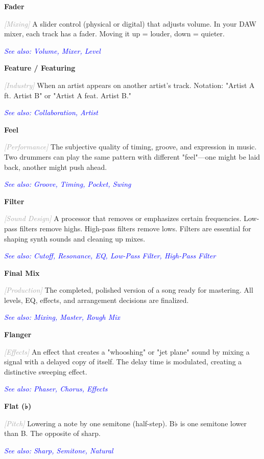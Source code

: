 \documentclass[11pt,letterpaper]{article}
\newcommand{\term}[1]{\textbf{\large\color{purple}#1}}
\newcommand{\category}[1]{\textcolor{darkgray}{\textit{\small [#1]}}}
\newcommand{\seealso}[1]{\textcolor{blue}{\textit{See also: #1}}}
\newenvironment{termdef}[1]
  {\noindent\term{#1}\par\nopagebreak}
  {\par\vspace{0.3em}}
\begin{document}
\begin{termdef}{Fader}
\category{Mixing}
A slider control (physical or digital) that adjusts volume. In your DAW mixer, each track has a fader. Moving it up = louder, down = quieter.

\seealso{Volume, Mixer, Level}
\end{termdef}

\begin{termdef}{Feature / Featuring}
\category{Industry}
When an artist appears on another artist's track. Notation: "Artist A ft. Artist B" or "Artist A feat. Artist B."

\seealso{Collaboration, Artist}
\end{termdef}

\begin{termdef}{Feel}
\category{Performance}
The subjective quality of timing, groove, and expression in music. Two drummers can play the same pattern with different "feel"—one might be laid back, another might push ahead.

\seealso{Groove, Timing, Pocket, Swing}
\end{termdef}

\begin{termdef}{Filter}
\category{Sound Design}
A processor that removes or emphasizes certain frequencies. Low-pass filters remove highs. High-pass filters remove lows. Filters are essential for shaping synth sounds and cleaning up mixes.

\seealso{Cutoff, Resonance, EQ, Low-Pass Filter, High-Pass Filter}
\end{termdef}

\begin{termdef}{Final Mix}
\category{Production}
The completed, polished version of a song ready for mastering. All levels, EQ, effects, and arrangement decisions are finalized.

\seealso{Mixing, Master, Rough Mix}
\end{termdef}

\begin{termdef}{Flanger}
\category{Effects}
An effect that creates a "whooshing" or "jet plane" sound by mixing a signal with a delayed copy of itself. The delay time is modulated, creating a distinctive sweeping effect.

\seealso{Phaser, Chorus, Effects}
\end{termdef}

\begin{termdef}{Flat (♭)}
\category{Pitch}
Lowering a note by one semitone (half-step). B♭ is one semitone lower than B. The opposite of sharp.

\seealso{Sharp, Semitone, Natural}
\end{termdef}
\end{document}
